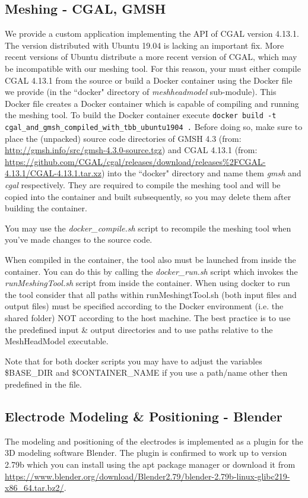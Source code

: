 \subsection{Meshing - CGAL, GMSH}
We provide a custom application implementing the API of CGAL version 4.13.1. The version distributed with Ubuntu 19.04 is lacking
an important fix. More recent versions of Ubuntu distribute a more recent version of CGAL, which may be incompatible with our meshing tool.
For this reason, your must either compile CGAL 4.13.1 from the source or build a Docker container using the Docker file we provide (in the
``docker" directory of \emph{meshheadmodel} sub-module). This Docker file creates a Docker
container which is capable of compiling and running the meshing tool. To build the Docker container execute
\newline
\lstinline[basicstyle=\ttfamily]{docker build -t  cgal_and_gmsh_compiled_with_tbb_ubuntu1904 .}
\newline
Before doing so, make sure to place the (unpacked) source code directories of GMSH 4.3 (from: \url{http://gmsh.info/src/gmsh-4.3.0-source.tgz})
and CGAL 4.13.1 (from: \url{https://github.com/CGAL/cgal/releases/download/releases%2FCGAL-4.13.1/CGAL-4.13.1.tar.xz}) into the ``docker"
directory and name them \emph{gmsh} and \emph{cgal} respectively. They are required to compile the meshing tool and will be copied into the
container and built subsequently, so you may delete them after building the container.\par
You may use the \emph{docker\_compile.sh} script to recompile the meshing tool when you've made changes to the source code.\par
When compiled in the container, the tool also must be launched from inside the container. You can do this by calling the \emph{docker\_run.sh}
script which invokes the \emph{runMeshingTool.sh} script from inside the container. When using docker to run the tool consider that all
paths within runMeshingtTool.sh (both input files and output files) must be specified according to the Docker environment (i.e. the shared folder)
NOT according to the host machine. The best practice is to use the predefined input \& output directories and to use paths relative to the
MeshHeadModel executable.\par
Note that for both docker scripts you may have to adjust the variables \$BASE\_DIR and \$CONTAINER\_NAME if you use a path/name other then
predefined in the file.

\subsection{Electrode Modeling \& Positioning - Blender}
The modeling and positioning of the electrodes is implemented as a plugin for the 3D modeling software Blender. The plugin is
confirmed to work up to version 2.79b which you can install using the apt package manager or download it from 
\url{https://www.blender.org/download/Blender2.79/blender-2.79b-linux-glibc219-x86\_64.tar.bz2/}.

